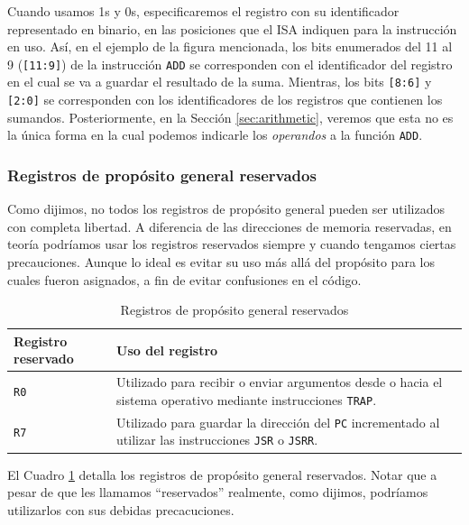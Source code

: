 \documentclass[a4paper, titlepage]{report}
\begin{document}
	Cuando usamos 1s y 0s, especificaremos el registro con su identificador representado en binario, en las posiciones que el ISA indiquen para la instrucción en uso. Así, en el ejemplo de la figura mencionada, los bits enumerados del 11 al 9 (\texttt{[11:9]}) de la instrucción \texttt{ADD} se corresponden con el identificador del registro en el cual se va a guardar el resultado de la suma. Mientras, los bits \texttt{[8:6]} y \texttt{[2:0]} se corresponden con los identificadores de los registros que contienen los sumandos. Posteriormente, en la Sección \ref{sec:arithmetic}, veremos que esta no es la única forma en la cual podemos indicarle los \textit{operandos} a la función \texttt{ADD}. %
	
	\subsubsection{Registros de propósito general reservados} %
	
	Como dijimos, no todos los registros de propósito general pueden ser utilizados con completa libertad. A diferencia de las direcciones de memoria reservadas, en teoría podríamos usar los registros reservados siempre y cuando tengamos ciertas precauciones. Aunque lo ideal es evitar su uso más allá del propósito para los cuales fueron asignados, a fin de evitar confusiones en el código.
	
	\begin{table}[h]
		\centering
		\begin{tabular}{l p{.6\linewidth}}
			\toprule
			\textbf{Registro reservado} &\textbf{Uso del registro} \\ \midrule
			\texttt{\large{}R0} & Utilizado para recibir o enviar argumentos desde o hacia el sistema operativo mediante instrucciones \texttt{TRAP}. \\
			\texttt{\large{}R7} & Utilizado para guardar la dirección del \texttt{PC} incrementado al utilizar las instrucciones \texttt{JSR} o \texttt{JSRR}. \\
			\bottomrule
		\end{tabular}
		\caption{Registros de propósito general reservados}
		\label{table:reserved-reg}
	\end{table}

	El Cuadro \ref{table:reserved-reg} detalla los registros de propósito general reservados. Notar que a pesar de que les llamamos ``reservados'' realmente, como dijimos, podríamos utilizarlos con sus debidas precacuciones.
	
\end{document}
